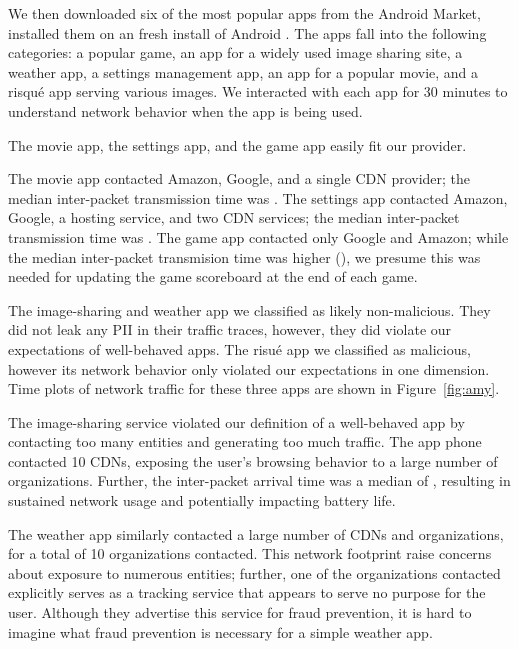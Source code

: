        We then downloaded six of the most popular apps from the Android Market, installed them on an fresh install of Android . 
       The apps fall into the following categories: a popular game, an app for a widely used image sharing site, a weather app, a settings 
        management app, an app for a popular movie, and a risqu\'{e} app serving various images. We interacted with each app for 30 minutes 
        to understand network behavior when the app is being used.

    The movie app, the settings app, and the game app easily fit our provider. 
    
    The movie app contacted Amazon, Google, and a single CDN provider; the median inter-packet transmission time was .
    The settings app contacted Amazon, Google, a hosting service, and two CDN services; the median inter-packet transmission time was .
    The game app contacted only Google and Amazon; while the median inter-packet transmision time was higher (), we presume this was needed for updating the game scoreboard at the end of each game.

    The image-sharing and weather app we classified as likely non-malicious. They did not leak any PII in their traffic traces, however, they did violate our expectations of well-behaved apps. The risu\'{e} app we classified as malicious, however its network behavior only violated our expectations in one dimension. 
    Time plots of network traffic for these three apps are shown in Figure~\ref{fig:amy}.

    The image-sharing service violated our definition of a well-behaved app by contacting too many entities and generating too much traffic. 
    The app phone contacted 10 CDNs, exposing the user's browsing behavior to a large number of organizations.
    Further, the inter-packet arrival time was a median of , resulting in sustained network usage and potentially impacting battery life.

    The weather app similarly contacted a large number of CDNs and organizations, for a total of 10 organizations contacted.
    This network footprint raise concerns about exposure to numerous entities; further, one of the organizations contacted explicitly serves as a tracking service that appears to serve no purpose for the user.
    Although they advertise this service for fraud prevention, it is hard to imagine what fraud prevention is necessary for a simple weather app.

